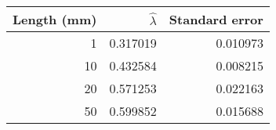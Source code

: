 \begin{tabular}{rrr}
\toprule
 Length (mm) &  $\hat{\lambda}$ &  Standard error \\
\midrule
           1 &         0.317019 &        0.010973 \\
          10 &         0.432584 &        0.008215 \\
          20 &         0.571253 &        0.022163 \\
          50 &         0.599852 &        0.015688 \\
\bottomrule
\end{tabular}
